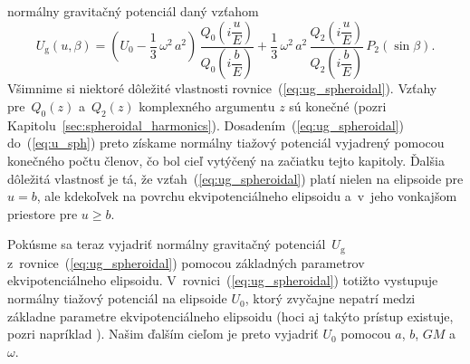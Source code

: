 \documentclass[a4paper,12pt]{book}
\newcommand{\gidx}{\mathrm g}
\begin{document}
normálny gravitačný potenciál daný vzťahom
%
\begin{equation}
\label{eq:ug_spheroidal}
U_\gidx(u, \beta) = \left( U_0 - \frac{1}{3} \, \omega^2 \, a^2 \right) \, 
\frac{Q_0\left( i \dfrac{u}{E} \right)}{Q_0\left( i \dfrac{b}{E} \right)} 
+ \frac{1}{3} \, \omega^2 \, a^2  \, \frac{Q_2\left( i \dfrac{u}{E} 
\right)}{Q_2\left( i \dfrac{b}{E} \right)} \, P_2(\sin\beta){.}
\end{equation}
%
Všimnime si niektoré dôležité vlastnosti rovnice~(\ref{eq:ug_spheroidal}).  
Vzťahy pre~$Q_0(z)$ a~$Q_2(z)$ komplexného argumentu $z$ sú konečné (pozri 
Kapitolu~\ref{sec:spheroidal_harmonics}).  Dosadením~(\ref{eq:ug_spheroidal}) 
do~(\ref{eq:u_sph}) preto získame normálny tiažový potenciál vyjadrený pomocou 
konečného počtu členov, čo bol cieľ vytýčený na začiatku tejto kapitoly.  
Ďalšia dôležitá vlastnosť je tá, že vzťah~(\ref{eq:ug_spheroidal}) platí nielen 
na elipsoide pre $u = b$, ale kdekoľvek na povrchu ekvipotenciálneho elipsoidu 
a~v~jeho vonkajšom priestore pre $u \geq b$.

Pokúsme sa teraz vyjadriť normálny gravitačný potenciál~$U_\gidx$ 
z~rovnice~(\ref{eq:ug_spheroidal}) pomocou základných parametrov 
ekvipotenciálneho elipsoidu.  V~rovnici~(\ref{eq:ug_spheroidal}) totižto 
vystupuje normálny tiažový potenciál na elipsoide $U_0$, ktorý zvyčajne nepatrí 
medzi základne parametre ekvipotenciálneho elipsoidu (hoci aj takýto prístup 
existuje, pozri napríklad \cite{TorgeGeodesy}).  Našim ďalším cieľom je preto  
vyjadriť $U_0$ pomocou $a$, $b$, $GM$ a~$\omega$.
\end{document}
